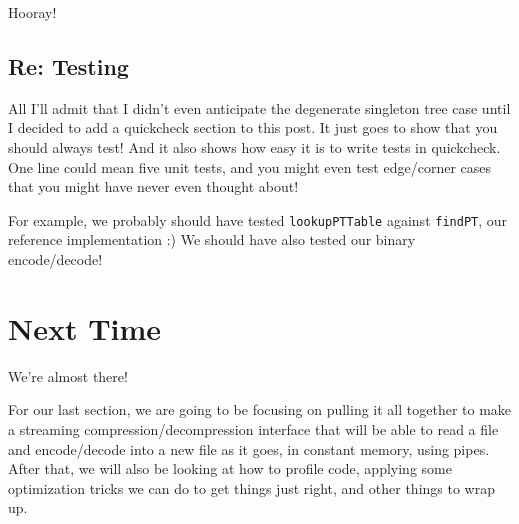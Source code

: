 \documentclass[]{article}
\begin{document}
Hooray!

\subsection{Re: Testing}\label{re-testing}

All I'll admit that I didn't even anticipate the degenerate singleton
tree case until I decided to add a quickcheck section to this post. It
just goes to show that you should always test! And it also shows how
easy it is to write tests in quickcheck. One line could mean five unit
tests, and you might even test edge/corner cases that you might have
never even thought about!

For example, we probably should have tested \texttt{lookupPTTable}
against \texttt{findPT}, our reference implementation :) We should have
also tested our binary encode/decode!

\section{Next Time}\label{next-time}

We're almost there!

For our last section, we are going to be focusing on pulling it all
together to make a streaming compression/decompression interface that
will be able to read a file and encode/decode into a new file as it
goes, in constant memory, using pipes. After that, we will also be
looking at how to profile code, applying some optimization tricks we can
do to get things just right, and other things to wrap up.
\end{document}
